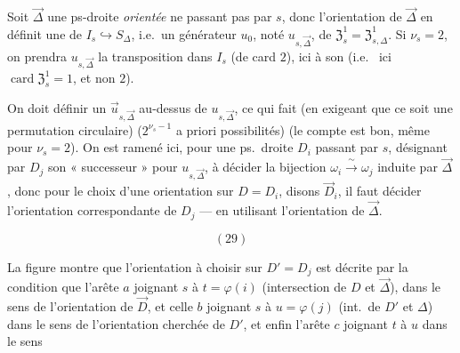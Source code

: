 \documentclass[11pt,a4paper]{article}
\begin{document}
Soit $\vec{\Delta}$ une ps-droite \emph{orientée} ne passant pas par $s$, donc l'orientation de $\vec{\Delta}$ en définit une de $I_s \hookrightarrow S_\Delta$, i.e.\ un générateur $u_0$, noté $u_{s,\vec{\Delta}}$, de $\mathfrak{Z}^{1}_s = \mathfrak{Z}^{1}_{s,\Delta}$. Si $\nu_s = 2$, on prendra $u_{s,\vec{\Delta}}$ la transposition dans $I_s$ (de card $2$),  ici à son  (i.e.\ \struck{\ill{}} ici $\operatorname{card} \mathfrak{Z}^{1}_s = 1$, et non $2$).

On  doit définir un $\vec{u}_{s,\vec{\Delta}}$ au-dessus de $u_{s,\vec{\Delta}}$, ce qui fait (en exigeant que ce soit une permutation circulaire) ($2^{\nu_s - 1}$ \struck{\ill{}} a priori possibilités) (le compte est bon, même pour $\nu_s = 2$). On est ramené ici, pour une ps.\ droite $D_i$ passant par $s$, désignant par $D_j$ son « successeur » pour $u_{s,\vec{\Delta}}$, à décider la bijection $\omega_i \xrightarrow{\ \sim\ } \omega_j$ induite par $\vec{\Delta}$, donc pour le choix d'une orientation sur $D = D_i$, disons $\vec{D}_i$, il faut décider l'orientation correspondante de $D_j$ --- en utilisant \ill{} l'orientation de $\vec{\Delta}$.

\[
(29)
\]

La figure montre que l'orientation à choisir sur $D' = D_j$ est décrite par la condition que l'arête $a$ joignant $s$ à $t = \varphi(i)$ (intersection de $D$ et $\vec{\Delta}$), dans le sens de l'orientation  de $\vec{D}$, et celle $b$ joignant $s$ à $u = \varphi(j)$ (int.\ de $D'$ et $\Delta$) dans le sens de l'orientation cherchée de $D'$, et enfin l'arête $c$ joignant $t$ à $u$ dans le sens
\end{document}
